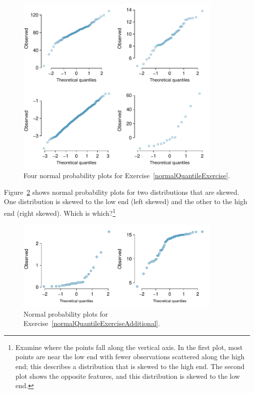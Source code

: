 \begin{figure}
\centering
\includegraphics[width=0.9\textwidth]{02/figures/normalQuantileExer/normalQuantileExer}
\caption{Four normal probability plots for Exercise~\ref{normalQuantileExercise}.}
\label{normalQuantileExer}
\end{figure}

\begin{exercise} \label{normalQuantileExerciseAdditional}
Figure~\ref{normalQuantileExerAdditional} shows normal probability plots for two distributions that are skewed. One distribution is skewed to the low end (left skewed) and the other to the high end (right skewed). Which is which?\footnote{Examine where the points fall along the vertical axis. In the first plot, most points are near the low end with fewer observations scattered along the high end; this describes a distribution that is skewed to the high end. The second plot shows the opposite features, and this distribution is skewed to the low end.}
\end{exercise}

\begin{figure}
\centering
\includegraphics[width=0.9\textwidth]{02/figures/normalQuantileExer/normalQuantileExerAdditional}
\caption{Normal probability plots for Exercise~\ref{normalQuantileExerciseAdditional}.}
\label{normalQuantileExerAdditional}
\end{figure}


